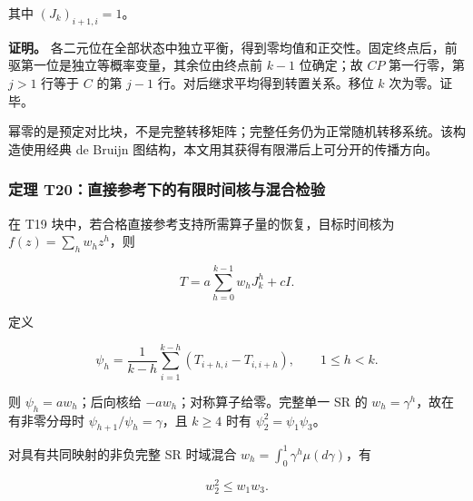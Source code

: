 \documentclass[11pt,a4paper]{article}
\begin{document}
其中 \((J_k)_{i+1,i}=1\)。

\textbf{证明。}
各二元位在全部状态中独立平衡，得到零均值和正交性。固定终点后，前驱第一位是独立等概率变量，其余位由终点前
\(k-1\) 位确定；故 \(CP\) 第一行零，第 \(j>1\) 行等于 \(C\) 的第 \(j-1\)
行。对后继求平均得到转置关系。移位 \(k\) 次为零。证毕。

幂零的是预定对比块，不是完整转移矩阵；完整任务仍为正常随机转移系统。该构造使用经典
de Bruijn 图结构，本文用其获得有限滞后上可分开的传播方向。

\subsubsection{定理
T20：直接参考下的有限时间核与混合检验}\label{ux5b9aux7406-t20ux76f4ux63a5ux53c2ux8003ux4e0bux7684ux6709ux9650ux65f6ux95f4ux6838ux4e0eux6df7ux5408ux68c0ux9a8c}

\par
\noindent\begin{minipage}{\linewidth}

在 T19 块中，若合格直接参考支持所需算子量的恢复，目标时间核为
\(f(z)=\sum_h w_hz^h\)，则

\[
T=a\sum_{h=0}^{k-1}w_hJ_k^h+cI.
\]

\end{minipage}\par

\par
\noindent\begin{minipage}{\linewidth}

定义

\[
\psi_h=\frac1{k-h}\sum_{i=1}^{k-h}
(T_{i+h,i}-T_{i,i+h}),\qquad 1\le h<k.
\]

\end{minipage}\par

则 \(\psi_h=aw_h\)；后向核给 \(-aw_h\)；对称算子给零。完整单一 SR 的
\(w_h=\gamma^h\)，故在有非零分母时 \(\psi_{h+1}/\psi_h=\gamma\)，且
\(k\ge4\) 时有 \(\psi_2^2=\psi_1\psi_3\)。

\par
\noindent\begin{minipage}{\linewidth}

对具有共同映射的非负完整 SR 时域混合
\(w_h=\int_0^1\gamma^h\mu(d\gamma)\)，有

\[
w_2^2\le w_1w_3.
\]

\end{minipage}\par
\end{document}
